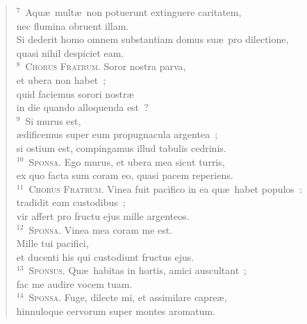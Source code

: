 \begin{flushleft}
\begin{verse}
${}^{7}$~Aqu\ae\ mult\ae\ non potuerunt extinguere caritatem,\\ nec flumina obruent illam.\\ Si dederit homo omnem substantiam domus su\ae\ pro dilectione,\\ quasi nihil despiciet eam.\\
${}^{8}$~\textsc{Chorus Fratrum.} Soror nostra parva,\\ et ubera non habet~;\\ quid faciemus sorori nostr\ae \\ in die quando alloquenda est~?\\
${}^{9}$~Si murus est,\\ \ae dificemus super eum propugnacula argentea~;\\ si ostium est, compingamus illud tabulis cedrinis.\\
${}^{10}$~\textsc{Sponsa.} Ego murus, et ubera mea sicut turris,\\ ex quo facta sum coram eo, quasi pacem reperiens.\\
${}^{11}$~\textsc{Chorus Fratrum.} Vinea fuit pacifico in ea qu\ae\ habet populos~:\\ tradidit eam custodibus~;\\ vir affert pro fructu ejus mille argenteos.\\
${}^{12}$~\textsc{Sponsa.} Vinea mea coram me est.\\ Mille tui pacifici,\\ et ducenti his qui custodiunt fructus ejus.\\
${}^{13}$~\textsc{Sponsus.} Qu\ae\ habitas in hortis, amici auscultant~;\\ fac me audire vocem tuam.\\
${}^{14}$~\textsc{Sponsa.} Fuge, dilecte mi, et assimilare capre\ae ,\\ hinnuloque cervorum super montes aromatum.\end{verse}\end{flushleft}



